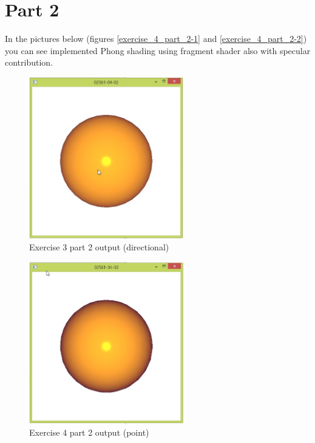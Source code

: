 \section{Part 2}
In the pictures below 
(figures \ref{exercise_4_part_2-1} and \ref{exercise_4_part_2-2}) 
you can see implemented
Phong shading using fragment shader also with specular contribution.
\begin{figure}[ht!]
	\begin{center}
		\includegraphics[width=0.6\textwidth]{figures/exercise_4_part_2-1}
	\end{center}
	\vspace{-4.5ex}\caption{Exercise 3 part 2 output (directional)}
	\label{fig:exercise_4_part_2-1} 
\end{figure}
\begin{figure}[ht!]
	\begin{center}
		\includegraphics[width=0.6\textwidth]{figures/exercise_4_part_2-2}
	\end{center}
	\vspace{-4.5ex}\caption{Exercise 4 part 2 output (point)}
	\label{fig:exercise_4_part_2-2} 
\end{figure}
\clearpage

